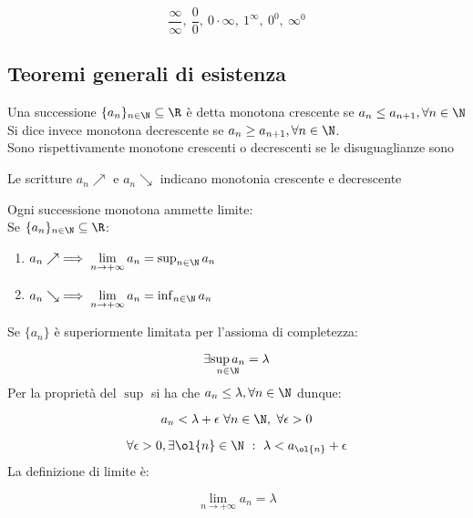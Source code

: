 \documentclass[../appunti.tex]{subfiles}
\begin{document}
\begin{equation} 
	\frac{\infty}{\infty},\  \frac{0}{0},\ 
	0 \cdot \infty,\ 1^{\infty},\
	0^0,\ \infty^0
\end{equation}

\subsection{Teoremi generali di esistenza}
Una successione $\{ a_n \}_{n \in \N} \subseteq \R$ è detta monotona crescente se 
$ a_n \leq a_{ n + 1 }, \forall n \in \N$ \\
Si dice invece monotona decrescente se $ a_n \geq a_{ n + 1}, \forall n \in \N $. \\
Sono rispettivamente \bt{strettamente} monotone crescenti o decrescenti se le disuguaglianze sono 

Le scritture $ a_n \nearrow$ e $ a_n \searrow $ indicano monotonia crescente e decrescente  

\begin{defn}
Ogni successione monotona ammette limite: \\
Se $ \{ a_n \}_{n \in \N} \subseteq \R $:

\begin{enumerate}
	\item $ a_n \nearrow \implies \lim \limits_{n \to + \infty} a_n = 
	\sup_{n \in \N} a_n$
	\item $ a_n \searrow \implies \lim \limits_{n \to + \infty} a_n =
	\inf_{n \in \N} a_n $
\end{enumerate}
\end{defn}

\begin{dimo}
Se $ \{ a_n \}$ è superiormente limitata per l'assioma di completezza:

\begin{equation}
	\exists \underset{n \in \N}{\sup a_n} = \lambda
\end{equation}
Per la proprietà del $ \sup$ si ha che $ a_n \leq \lambda, \forall n \in \N$ dunque:

\begin{equation}
	a_n < \lambda + \epsilon \ \forall n \in \N, \ \forall \epsilon > 0
\end{equation}

\begin{equation}
	\forall \epsilon > 0, \exists \ol{n} \in \N\ :\
	\lambda < a_{\ol{n}} + \epsilon
\end{equation}
La definizione di limite è:

\begin{equation}
	\lim \limits_{n \to + \infty} a_n = \lambda
\end{equation}
\end{dimo}
\end{document}
